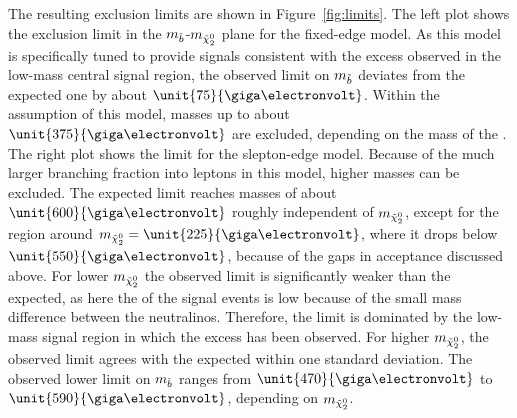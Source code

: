 The resulting exclusion limits are shown in Figure~\ref{fig:limits}. The left plot shows the exclusion limit in the $m_{\tilde{b}}$-$m_{{\tilde{\chi}^0_2}}$ plane for the fixed-edge model. As this model is specifically tuned to provide signals consistent with the excess observed in the low-mass central signal region, the observed limit on $m_{\tilde{b}}$ deviates from the expected one by about $\unit{75}{\giga\electronvolt}$. Within the assumption of this model, \sbottom masses up to about $\unit{375}{\giga\electronvolt}$ are excluded, depending on the mass of the \secondchi. The right plot shows the limit for the slepton-edge model. Because of the much larger branching fraction into leptons in this model, higher masses can be excluded. The expected limit reaches \sbottom masses of about $\unit{600}{\giga\electronvolt}$ roughly independent of $m_{{\tilde{\chi}^0_2}}$, except for the region around $m_{\secondchi} = \unit{225}{\giga\electronvolt}$, where it drops below $\unit{550}{\giga\electronvolt}$, because of the gaps in acceptance discussed above. For lower $m_{{\tilde{\chi}^0_2}}$ the observed limit is significantly weaker than the expected, as here the \mll of the signal events is low because of the small mass difference between the neutralinos. Therefore, the limit is dominated by the low-mass signal region in which the excess has been observed. For higher $m_{{\tilde{\chi}^0_2}}$, the observed limit agrees with the expected within one standard deviation. The observed lower limit on $m_{\tilde{b}}$ ranges from $\unit{470}{\giga\electronvolt}$ to $\unit{590}{\giga\electronvolt}$, depending on $m_{{\tilde{\chi}^0_2}}$.

